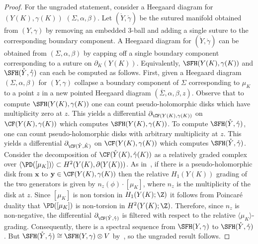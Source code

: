 \documentclass{amsart}
\theoremstyle{definition}
\theoremstyle{remark}
\numberwithin{equation}{section}
\begin{document}
\begin{proof}
    For the ungraded statement, consider a Heegaard diagram for $(Y(K),\gamma(K))$ $(\Sigma,\alpha,\beta)$. Let $(\mathring{Y},\mathring{\gamma})$ be the sutured manifold obtained from $(Y,\gamma)$ by removing an embedded $3$-ball and adding a single suture to the corresponding boundary component. A Heegaard diagram for $(\mathring{Y},\mathring{\gamma})$ can be obtained from $(\Sigma,\alpha,\beta)$ by capping off a single boundary component corresponding to a suture on $\partial_K(Y(K))$. Equivalently, $\SFH(Y(K),\gamma(K))$ and $\SFH(\mathring{Y},\mathring{\gamma})$ can each be computed as follows. First, given a Heegaard diagram $(\Sigma,\alpha,\beta)$ for $(Y,\gamma)$ collapse a boundary component of $\Sigma$ corresponding to $\mu_K$ to a point $z$ in a new pointed Heegaard diagram $(\overline{\Sigma},\alpha,\beta,z)$. Observe that to compute $\SFH(Y(K),\gamma(K))$ one can count pseudo-holomorphic disks which have multiplicity zero at $z$. This yields a differential $\partial_{\CF(Y(K),\gamma(K))}$ on $\CF(Y(K),\gamma(K))$ which computes $\SFH(Y(K),\gamma(K))$. To compute $\SFH(\mathring{Y},\mathring{\gamma})$, one can count pseudo-holomorphic disks with arbitrary multiplicity at $z$. This yields a differential $\partial_{\CF(\mathring{Y},\mathring{K})}$ on $\CF(Y(K),\gamma(K))$ which computes $\SFH(\mathring{Y},\mathring{\gamma})$. Consider the decomposition of $\CF(\mathring{Y}(K),\mathring{\gamma}(K))$ as a relatively graded complex over $\langle \PD([\mu_K])\rangle\subset H^2(Y(K),\partial(Y(K)))$.  As in~\cite[Lemma 3.11]{HolomorphicdiskslinkinvariantsandthemultivariableAlexanderpolynomial}, if there is a pseudo-holomorphic disk from $\mathbf{x}$ to $\mathbf{y}\in\CF(Y(K),\gamma(K))$ then the relative  $H_1(Y(K))$ grading of the two generators is given by $n_z(\phi)\cdot[\mu_K]$, where $n_z$ is the multiplicity of the disk at $z$. Since $[\mu_K]$ is non torsion in $H_1(Y(K);\Z)$ it follows from Poincar\'e duality that $\PD([\mu_K])$ is non-torsion in $H^2(Y(K);\Z)$. Therefore, since $n_z$ is non-negative, the differential $\partial_{\CF(\mathring{Y},\mathring{\gamma})}$ is filtered with respect to the relative $\langle \mu_K\rangle$-grading. Consequently, there is a spectral sequence from $\SFH(Y,\gamma)$ to $\SFH(\mathring{Y},\mathring{\gamma})$. But $\SFH(\mathring{Y},\mathring{\gamma})\cong\SFH(Y,\gamma)\otimes V$ by~\cite[Equation 9.1]{juhasz2006holomorphic}, so the ungraded result follows. 




\end{proof}
\end{document}
